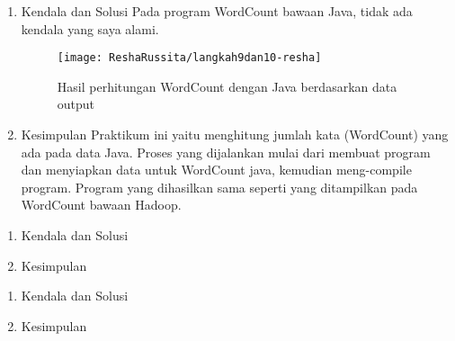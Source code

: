 \begin{enumerate}
\item Kendala dan Solusi
\newline Pada program WordCount bawaan Java, tidak ada kendala yang saya alami.

\begin{figure}[!ht]
\texttt{[image: ReshaRussita/langkah9dan10-resha]}
\caption{Hasil perhitungan WordCount dengan Java berdasarkan data output}
\label{gam:perkuliahan-08-12}
\end{figure}

\item Kesimpulan
\newline Praktikum ini yaitu menghitung jumlah kata (WordCount) yang ada pada data Java. Proses yang dijalankan mulai dari membuat program dan menyiapkan data untuk WordCount java, kemudian meng-compile program. Program yang dihasilkan sama seperti yang ditampilkan pada WordCount bawaan Hadoop.

\end{enumerate}

\begin{enumerate}
\item Kendala dan Solusi

\item Kesimpulan

\end{enumerate}

\begin{enumerate}
\item Kendala dan Solusi

\item Kesimpulan

\end{enumerate}